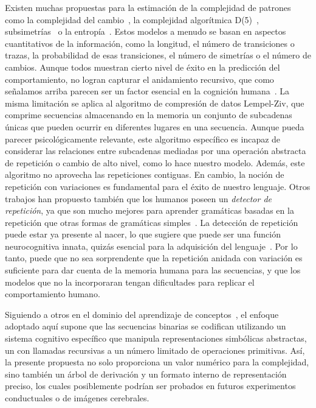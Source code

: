 Existen muchas propuestas para la estimación de la complejidad de patrones como la complejidad del cambio~\cite{f47}, la complejidad algorítmica D(5)~\cite{f44,f45,f46}, subsimetrías~\cite{f94} o la entropía~\cite{f34,f96,f97,f98,f111}. Estos modelos a menudo se basan en aspectos cuantitativos de la información, como la longitud, el número de transiciones o trazas, la probabilidad de esas transiciones, el número de simetrías o el número de cambios. Aunque todos muestran cierto nivel de éxito en la predicción del comportamiento, no logran capturar el anidamiento recursivo, que como señalamos arriba parecen ser un factor esencial en la cognición humana~\cite{f4,f6}. La misma limitación se aplica al algoritmo de compresión de datos Lempel-Ziv, que comprime secuencias almacenando en la memoria un conjunto de subcadenas únicas que pueden ocurrir en diferentes lugares en una secuencia. Aunque pueda parecer psicológicamente relevante, este algoritmo específico es incapaz de considerar las relaciones entre subcadenas mediadas por una operación abstracta de repetición o cambio de alto nivel, como lo hace nuestro modelo. Además, este algoritmo no aprovecha las repeticiones contiguas. En cambio, la noción de repetición con variaciones es fundamental para el éxito de nuestro lenguaje. Otros trabajos han propuesto también que los humanos poseen un \textit{detector de repetición}, ya que son mucho mejores para aprender gramáticas basadas en la repetición que otras formas de gramáticas simples~\cite{f113}. La detección de repetición puede estar ya presente al nacer, lo que sugiere que puede ser una función neurocognitiva innata, quizás esencial para la adquisición del lenguaje~\cite{f114}. Por lo tanto, puede que no sea sorprendente que la repetición anidada con variación es suficiente para dar cuenta de la memoria humana para las secuencias, y que los modelos que no la incorporaran tengan dificultades para replicar el comportamiento humano.


Siguiendo a otros en el dominio del aprendizaje de conceptos~\cite{piantadosi2012bootstrapping,piantadosi2016logical}, el enfoque adoptado aquí supone que las secuencias binarias se codifican utilizando un sistema cognitivo específico que manipula representaciones simbólicas abstractas, un \lot con llamadas recursivas a un número limitado de operaciones primitivas. Así, la presente propuesta no solo proporciona un valor numérico para la complejidad, sino también un árbol de derivación y un formato interno de representación preciso, los cuales posiblemente podrían ser probados en futuros experimentos conductuales o de imágenes cerebrales.

